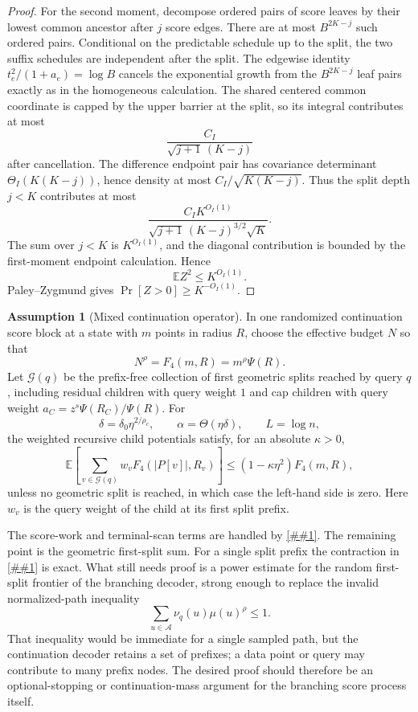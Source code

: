 \documentclass[10pt]{article}
\newcommand{\cref}[1]{\ref{##1}}
\theoremstyle{definition}
\newtheorem{assumption}[theorem]{Assumption}
\newcommand{\E}{\mathbb{E}}
\begin{document}
\begin{proof}
   For the second moment, decompose ordered pairs of score leaves by their lowest common ancestor after $j$ score edges. There are at most $B^{2K-j}$ such ordered pairs. Conditional on the predictable schedule up to the split, the two suffix schedules are independent after the split. The edgewise identity $t_e^2/(1+a_e)=\log B$ cancels the exponential growth from the $B^{2K-j}$ leaf pairs exactly as in the homogeneous calculation. The shared centered common coordinate is capped by the upper barrier at the split, so its integral contributes at most
   \[
      \frac{C_I}{\sqrt{j+1}\,(K-j)}
   \]
   after cancellation. The difference endpoint pair has covariance determinant $\Theta_I(K(K-j))$, hence density at most $C_I/\sqrt{K(K-j)}$. Thus the split depth $j<K$ contributes at most
   \[
      \frac{C_I K^{O_I(1)}}{\sqrt{j+1}\,(K-j)^{3/2}\sqrt K}.
   \]
   The sum over $j<K$ is $K^{O_I(1)}$, and the diagonal contribution is bounded by the first-moment endpoint calculation. Hence
   \[
      \E Z^2\le K^{O_I(1)}.
   \]
   Paley--Zygmund gives $\Pr[Z>0]\ge K^{-O_I(1)}$.
\end{proof}

\begin{assumption}[Mixed continuation operator]\label{asm:mixed-continuation-operator}
   In one randomized continuation score block at a state with $m$ points in radius $R$, choose the effective budget $N$ so that
   \[
      N^\rho=F_4(m,R)=m^\rho\Psi(R).
   \]
   Let $\mathcal G(q)$ be the prefix-free collection of first geometric splits reached by query $q$, including residual children with query weight $1$ and cap children with query weight $a_C=z^s\Psi(R_C)/\Psi(R)$. For
   \[
      \delta=\delta_0\eta^{2/\rho_c},
      \qquad
      \alpha=\Theta(\eta\delta),
      \qquad
      L=\log n,
   \]
   the weighted recursive child potentials satisfy, for an absolute $\kappa>0$,
   \[
      \E\left[
         \sum_{v\in\mathcal G(q)} w_vF_4(|P[v]|,R_v)
      \right]
      \le
      (1-\kappa\eta^2)F_4(m,R),
   \]
   unless no geometric split is reached, in which case the left-hand side is zero.
   Here $w_v$ is the query weight of the child at its first split prefix.
\end{assumption}

The score-work and terminal-scan terms are handled by \cref{lem:cap-free-scan-accounting}. The remaining point is the geometric first-split sum. For a single split prefix the contraction in \cref{lem:thin-cap-contraction} is exact. What still needs proof is a power estimate for the random first-split frontier of the branching decoder, strong enough to replace the invalid normalized-path inequality
\[
   \sum_{u\in\mathcal A}\nu_q(u)\mu(u)^\rho\le 1.
\]
That inequality would be immediate for a single sampled path, but the continuation decoder retains a set of prefixes; a data point or query may contribute to many prefix nodes. The desired proof should therefore be an optional-stopping or continuation-mass argument for the branching score process itself.
\end{document}
